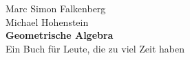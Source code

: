 \begin{titlepage}
	\begin{flushleft}
		\vspace*{3.5cm}
		Marc Simon Falkenberg\\
		Michael Hohenstein\\
		\vspace{1.5cm}
		\textbf{\Huge{\color{myblue} Geometrische Algebra}}\\%
		\vspace{1cm}
		Ein Buch für Leute, die zu viel Zeit haben\\%
		\vfill
	\end{flushleft}
\end{titlepage}
